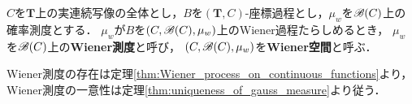 	\begin{screen}
		\begin{dfn}[Wiener測度]
			$C$を$\mathbf{T}$上の実連続写像の全体とし，$B$を$(\mathbf{T},C)$-座標過程とし，$\mu_w$を$\mathscr{B}(C)$上の確率測度とする．
			$\mu_w$が$B$を$(C,\mathscr{B}(C),\mu_w)$上のWiener過程たらしめるとき，
			$\mu_w$を$\mathscr{B}(C)$上の{\bf Wiener測度}と呼び，
			$(C,\mathscr{B}(C),\mu_w)$を{\bf Wiener空間}と呼ぶ．
		\end{dfn}
	\end{screen}
	
	Wiener測度の存在は定理\ref{thm:Wiener_process_on_continuous_functions}より，
	Wiener測度の一意性は定理\ref{thm:uniqueness_of_gauss_measure}より従う．